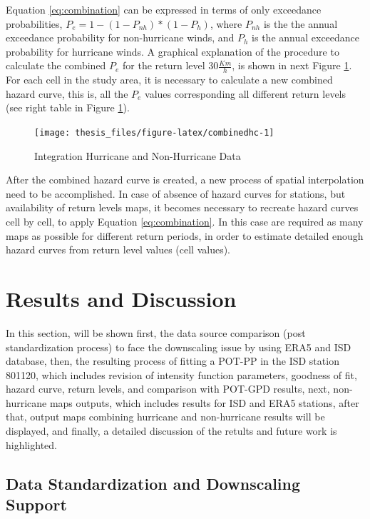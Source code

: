 \documentclass[12pt,oneside]{reedthesis}
\begin{document}
Equation \eqref{eq:combination} can be expressed in terms of only exceedance probabilities, \(P_{e} = 1 - (1 -P_{nh}) * (1 - P_{h})\), where \(P_{nh}\) is the the annual exceedance probability for non-hurricane winds, and \(P_{h}\) is the annual exceedance probability for hurricane winds. A graphical explanation of the procedure to calculate the combined \(P_e\) for the return level \(30\frac{Km}{h}\), is shown in next Figure \ref{fig:combinedhc}. For each cell in the study area, it is necessary to calculate a new combined hazard curve, this is, all the \(P_e\) values corresponding all different return levels (see right table in Figure \ref{fig:combinedhc}).
\begin{figure}

{\centering \texttt{[image: thesis\_files/figure-latex/combinedhc-1]} 

}

\caption{Integration Hurricane and Non-Hurricane Data}\label{fig:combinedhc}
\end{figure}
After the combined hazard curve is created, a new process of spatial interpolation need to be accomplished. In case of absence of hazard curves for stations, but availability of return levels maps, it becomes necessary to recreate hazard curves cell by cell, to apply Equation \eqref{eq:combination}. In this case are required as many maps as possible for different return periods, in order to estimate detailed enough hazard curves from return level values (cell values).

\hypertarget{rmd-results}{%
\chapter{Results and Discussion}\label{rmd-results}}

In this section, will be shown first, the data source comparison (post standardization process) to face the downscaling issue by using ERA5 and ISD database, then, the resulting process of fitting a POT-PP in the ISD station 801120, which includes revision of intensity function parameters, goodness of fit, hazard curve, return levels, and comparison with POT-GPD results, next, non-hurricane maps outputs, which includes results for ISD and ERA5 stations, after that, output maps combining hurricane and non-hurricane results will be displayed, and finally, a detailed discussion of the retults and future work is highlighted.

\hypertarget{data-standardization-and-downscaling-support}{%
\section{Data Standardization and Downscaling Support}\label{data-standardization-and-downscaling-support}}
\end{document}
